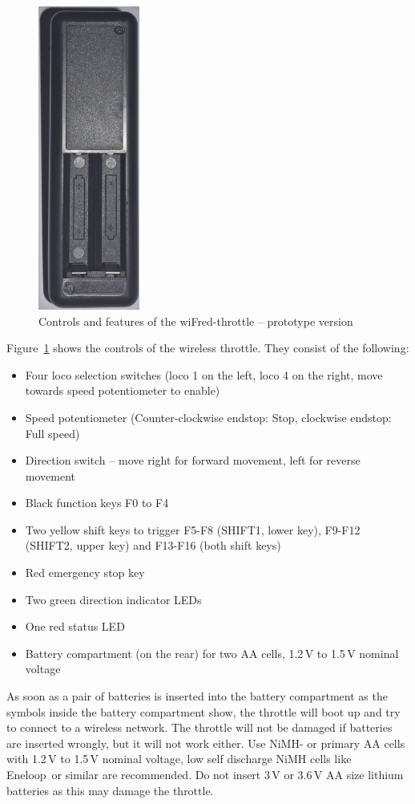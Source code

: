 \documentclass[11pt,a4paper]{scrartcl}
\begin{document}
\begin{figure}[tbh]
  \includegraphics[height=100mm]{images/throttle_Back_openBattery}
  \caption{Controls and features of the wiFred-throttle -- prototype version}
  \label{oldThrottleControls}
\end{figure}

Figure~\ref{oldThrottleControls} shows the controls of the wireless throttle. They consist of the following:

\begin{itemize}
\item Four loco selection switches (loco 1 on the left, loco 4 on the right, move towards speed potentiometer to enable)
\item Speed potentiometer (Counter-clockwise endstop: Stop, clockwise endstop: Full speed)
\item Direction switch -- move right for forward movement, left for reverse movement
\item Black function keys F0 to F4
\item Two yellow shift keys to trigger F5-F8 (SHIFT1, lower key), F9-F12 (SHIFT2, upper key) and F13-F16 (both shift keys)
\item Red emergency stop key
\item Two green direction indicator LEDs
\item One red status LED
\item Battery compartment (on the rear) for two AA cells, 1.2\,V to 1.5\,V nominal voltage
\end{itemize}

As soon as a pair of batteries is inserted into the battery compartment as the symbols inside the battery compartment show, the throttle will boot up and try to connect to a wireless network. The throttle will not be damaged if batteries are inserted wrongly, but it will not work either. Use NiMH- or primary AA cells with 1.2\,V to 1.5\,V nominal voltage, low self discharge NiMH cells like Eneloop\textregistered\ or similar are recommended. Do not insert 3\,V or 3.6\,V AA size lithium batteries as this may damage the throttle.
\end{document}
